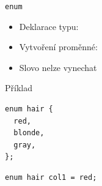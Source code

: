 \begin{frame}[fragile]{\texttt{enum}}

  \begin{itemize}
    \item Deklarace typu: 

    \pause

    \item Vytvoření proměnné: 

    \pause

    \item Slovo  nelze vynechat

  \end{itemize}


\begin{block}{Příklad}
\begin{lstlisting}
enum hair {
  red,
  blonde,
  gray,
};
\end{lstlisting}
\begin{lstlisting}
enum hair col1 = red;
\end{lstlisting}
\end{block}

\end{frame}

